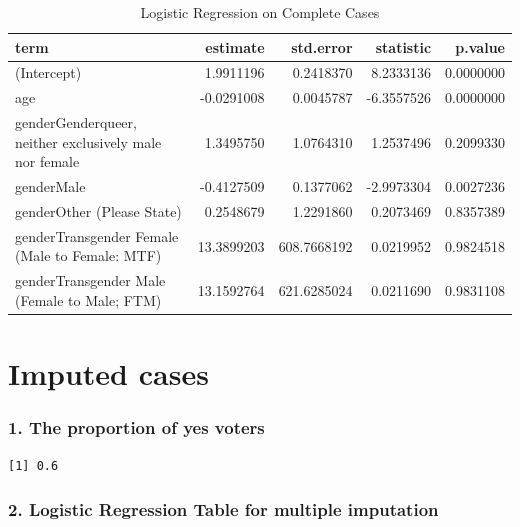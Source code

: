 \documentclass[
  letterpaper,
  DIV=11,
  numbers=noendperiod]{scrartcl}
\begin{document}
\begin{longtable}[t]{lrrrr}
\caption{Logistic Regression on Complete Cases}\\
\toprule
term & estimate & std.error & statistic & p.value\\
\midrule
(Intercept) & 1.9911196 & 0.2418370 & 8.2333136 & 0.0000000\\
age & -0.0291008 & 0.0045787 & -6.3557526 & 0.0000000\\
genderGenderqueer, neither exclusively male nor female & 1.3495750 & 1.0764310 & 1.2537496 & 0.2099330\\
genderMale & -0.4127509 & 0.1377062 & -2.9973304 & 0.0027236\\
genderOther (Please State) & 0.2548679 & 1.2291860 & 0.2073469 & 0.8357389\\
\addlinespace
genderTransgender Female (Male to Female: MTF) & 13.3899203 & 608.7668192 & 0.0219952 & 0.9824518\\
genderTransgender Male (Female to Male; FTM) & 13.1592764 & 621.6285024 & 0.0211690 & 0.9831108\\
\bottomrule
\end{longtable}

\section{Imputed cases}\label{imputed-cases}

\subsubsection{1. The proportion of yes
voters}\label{the-proportion-of-yes-voters}

\begin{verbatim}
[1] 0.6
\end{verbatim}

\subsubsection{2. Logistic Regression Table for multiple
imputation}\label{logistic-regression-table-for-multiple-imputation}
\end{document}
